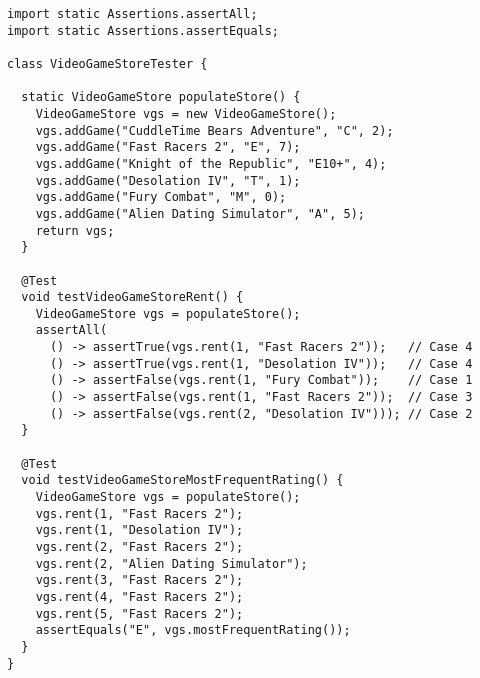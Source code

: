 \begin{lstlisting}[language=MyJava]
import static Assertions.assertAll;
import static Assertions.assertEquals;

class VideoGameStoreTester {

  static VideoGameStore populateStore() {
    VideoGameStore vgs = new VideoGameStore();
    vgs.addGame("CuddleTime Bears Adventure", "C", 2);
    vgs.addGame("Fast Racers 2", "E", 7);
    vgs.addGame("Knight of the Republic", "E10+", 4);
    vgs.addGame("Desolation IV", "T", 1);
    vgs.addGame("Fury Combat", "M", 0);
    vgs.addGame("Alien Dating Simulator", "A", 5);
    return vgs;
  }

  @Test
  void testVideoGameStoreRent() {
    VideoGameStore vgs = populateStore();
    assertAll(
      () -> assertTrue(vgs.rent(1, "Fast Racers 2"));   // Case 4
      () -> assertTrue(vgs.rent(1, "Desolation IV"));   // Case 4
      () -> assertFalse(vgs.rent(1, "Fury Combat"));    // Case 1
      () -> assertFalse(vgs.rent(1, "Fast Racers 2"));  // Case 3
      () -> assertFalse(vgs.rent(2, "Desolation IV"))); // Case 2
  }

  @Test
  void testVideoGameStoreMostFrequentRating() {
    VideoGameStore vgs = populateStore();
    vgs.rent(1, "Fast Racers 2");
    vgs.rent(1, "Desolation IV");
    vgs.rent(2, "Fast Racers 2");
    vgs.rent(2, "Alien Dating Simulator");
    vgs.rent(3, "Fast Racers 2");
    vgs.rent(4, "Fast Racers 2");
    vgs.rent(5, "Fast Racers 2");
    assertEquals("E", vgs.mostFrequentRating());
  }
}
\end{lstlisting}

